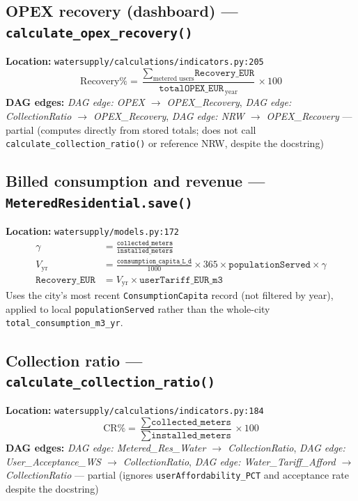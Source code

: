 \documentclass[11pt]{article}
\newcommand{\code}[1]{\texttt{#1}}
\newcommand{\dagedge}[1]{\textit{DAG edge: #1}}
\newcommand{\statuspartial}{\textcolor{orange!80!black}{partial}}
\begin{document}
\subsection{OPEX recovery (dashboard) --- \code{calculate\_opex\_recovery()}}
\textbf{Location:} \code{watersupply/calculations/indicators.py:205}
\begin{equation}
  \text{Recovery\%} = \frac{\sum_{\text{metered users}} \texttt{Recovery\_EUR}}{\texttt{totalOPEX\_EUR}_{\,\text{year}}} \times 100
\end{equation}
\textbf{DAG edges:} \dagedge{OPEX $\rightarrow$ OPEX\_Recovery}, \dagedge{CollectionRatio $\rightarrow$ OPEX\_Recovery}, \dagedge{NRW $\rightarrow$ OPEX\_Recovery} --- \statuspartial{} (computes directly from stored totals; does not call \code{calculate\_collection\_ratio()} or reference NRW, despite the docstring)

\subsection{Billed consumption and revenue --- \code{MeteredResidential.save()}}
\textbf{Location:} \code{watersupply/models.py:172}
\begin{align}
  \gamma &= \frac{\texttt{collected\_meters}}{\texttt{installed\_meters}} \\
  V_{\text{yr}} &= \frac{\texttt{consumption\_capita\_L\_d}}{1000} \times 365 \times \texttt{populationServed} \times \gamma \\
  \texttt{Recovery\_EUR} &= V_{\text{yr}} \times \texttt{userTariff\_EUR\_m3}
\end{align}
Uses the city's most recent \code{ConsumptionCapita} record (not filtered by year), applied to local \code{populationServed} rather than the whole-city \code{total\_consumption\_m3\_yr}.

\subsection{Collection ratio --- \code{calculate\_collection\_ratio()}}
\textbf{Location:} \code{watersupply/calculations/indicators.py:184}
\begin{equation}
  \text{CR\%} = \frac{\sum \texttt{collected\_meters}}{\sum \texttt{installed\_meters}} \times 100
\end{equation}
\textbf{DAG edges:} \dagedge{Metered\_Res\_Water $\rightarrow$ CollectionRatio}, \dagedge{User\_Acceptance\_WS $\rightarrow$ CollectionRatio}, \dagedge{Water\_Tariff\_Afford $\rightarrow$ CollectionRatio} --- \statuspartial{} (ignores \code{userAffordability\_PCT} and acceptance rate despite the docstring)
\end{document}
